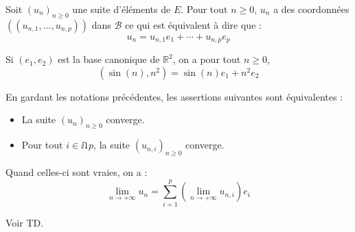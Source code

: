 \documentclass[french,11pt,twoside]{VcCours}
\begin{document}
Soit $(u_n)_{n \geq 0}$ une suite d'éléments de $E$. Pour tout $n \geq 0$, $u_n$ a des coordonnées $((u_{n,1}, \ldots, u_{n,p}))$ dans $\mathcal{B}$ ce qui est équivalent à dire que :
$$ u_n = u_{n,1} e_1 + \cdots + u_{n,p} e_p $$

\begin{Exemple} Si $(e_1,e_2)$ est la base canonique de $\mathbb{R}^2$, on a pour tout $n \geq 0$,
$$ (\sin(n),n^2) = \sin(n) e_1 + n^2e_2$$
\end{Exemple}

\begin{Theoreme}{} En gardant les notations précédentes, les assertions suivantes sont équivalentes :
\begin{itemize}
\item La suite $(u_n)_{n \geq 0}$ converge.
\item Pour tout $i \in \ii{1}{p}$, la suite $(u_{n,i})_{n \geq 0}$ converge.
\end{itemize}
Quand celles-ci sont vraies, on a :
$$ \lim_{n \rightarrow + \infty} u_n = \sum_{i=1}^p \left(\lim_{n \rightarrow + \infty} u_{n,i} \right) e_i $$
\end{Theoreme}

\begin{Demonstration}{} Voir TD.
\end{Demonstration}
\end{document}
